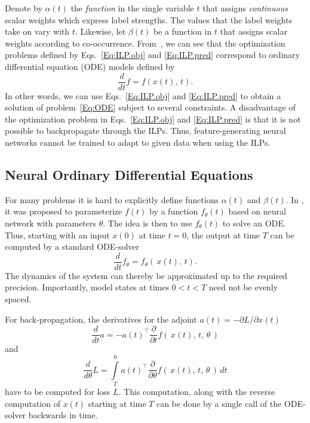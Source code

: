 \documentclass[runningheads]{llncs}
\begin{document}
Denote by $\alpha(t)$ the \emph{function} in the single variable $t$ that assigns \emph{continuous} scalar weights which express label strengths. The values that the label weights take on vary with $t$.  
Likewise, let $\beta(t)$ be a function in $t$ that assigns scalar weights according to co-occurrence. From~\cite{Fuegenschuh2006:CombinatorialModels}, we can see that the optimization problems defined by Eqs.~\eqref{Eq:ILP.obj} and \eqref{Eq:ILP.pred} correspond to ordinary differential equation (ODE) models defined by
\begin{equation}
    \frac{d}{dt} f = f(x(t), \, t).
    \label{Eq:ODE}
\end{equation}
In other words, we can use Eqs.~\eqref{Eq:ILP.obj} and \eqref{Eq:ILP.pred} to obtain a solution of problem~\eqref{Eq:ODE} subject to several constraints. A disadvantage of the optimization problem in Eqs.~\eqref{Eq:ILP.obj} and \eqref{Eq:ILP.pred} is that it is not possible to backpropagate through the ILPs. Thus, feature-generating neural networks cannot be trained to adapt to given data when using the ILPs.





\subsection{Neural Ordinary Differential Equations~\cite{Chen2018:NODE}} 
\label{Sec:NODE} 
For many problems it is hard to explicitly define functions $\alpha(t)$ and $\beta(t)$. In \cite{Chen2018:NODE}, it was proposed to parameterize $f(t)$ by a function $f_\theta(t)$ based on neural network with parameters $\theta$. The idea is then to use $f_\theta(t)$ to solve an ODE. 
Thus, starting with an input $x(0)$ at time $t=0$, the output at time $T$ can be computed by a standard ODE-solver 
\begin{equation}
    \frac{d}{dt} f_\theta = f_\theta \left( \, x(t), \, t \right).
    \label{Eq:NODE}
\end{equation}
The dynamics of the system can thereby be approximated up to the required precision. Importantly, model states at times $0<t<T$ need not be evenly spaced. 






For back-propagation, the derivatives for the adjoint $a(t) = -\partial L / \partial x(t)$ 
\begin{equation}
    \frac{d}{d t} a = -a(t)^\top \frac{\partial}{\partial t} f ( \, x(t), \, t, \, \theta \, )
\end{equation}
and
\begin{equation}
    \frac{d}{d \theta} L = \int \limits_T^0 a(t)^\top \frac{\partial}{\partial \theta} f ( \, x(t), \, t, \, \theta \, ) \, dt
\end{equation}
have to be computed for loss $L$. This computation, along with the reverse computation of $x(t)$ starting at time $T$ can be done by a single call of the ODE-solver backwards in time. 
\end{document}
